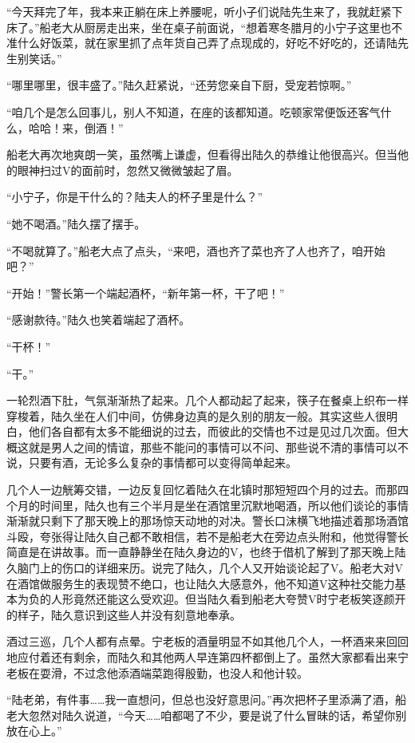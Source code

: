 “今天拜完了年，我本来正躺在床上养腰呢，听小子们说陆先生来了，我就赶紧下床了。”船老大从厨房走出来，坐在桌子前面说，“想着寒冬腊月的小宁子这里也不准什么好饭菜，就在家里抓了点年货自己弄了点现成的，好吃不好吃的，还请陆先生别笑话。”

“哪里哪里，很丰盛了。”陆久赶紧说，“还劳您亲自下厨，受宠若惊啊。”

“咱几个是怎么回事儿，别人不知道，在座的该都知道。吃顿家常便饭还客气什么，哈哈！来，倒酒！”

船老大再次地爽朗一笑，虽然嘴上谦虚，但看得出陆久的恭维让他很高兴。但当他的眼神扫过V的面前时，忽然又微微皱起了眉。

“小宁子，你是干什么的？陆夫人的杯子里是什么？”

“她不喝酒。”陆久摆了摆手。

“不喝就算了。”船老大点了点头，“来吧，酒也齐了菜也齐了人也齐了，咱开始吧？”

“开始！”警长第一个端起酒杯，“新年第一杯，干了吧！”

“感谢款待。”陆久也笑着端起了酒杯。

“干杯！”

“干。”

一轮烈酒下肚，气氛渐渐热了起来。几个人都动起了起来，筷子在餐桌上织布一样穿梭着，陆久坐在人们中间，仿佛身边真的是久别的朋友一般。其实这些人很明白，他们各自都有太多不能细说的过去，而彼此的交情也不过是见过几次面。但大概这就是男人之间的情谊，那些不能问的事情可以不问、那些说不清的事情可以不说，只要有酒，无论多么复杂的事情都可以变得简单起来。

几个人一边觥筹交错，一边反复回忆着陆久在北镇时那短短四个月的过去。而那四个月的时间里，陆久也有三个半月是坐在酒馆里沉默地喝酒，所以他们谈论的事情渐渐就只剩下了那天晚上的那场惊天动地的对决。警长口沫横飞地描述着那场酒馆斗殴，夸张得让陆久自己都不敢相信，若不是船老大在旁边点头附和，他觉得警长简直是在讲故事。而一直静静坐在陆久身边的V，也终于借机了解到了那天晚上陆久脑门上的伤口的详细来历。说完了陆久，几个人又开始谈论起了V。船老大对V在酒馆做服务生的表现赞不绝口，也让陆久大感意外，他不知道V这种社交能力基本为负的人形竟然还能这么受欢迎。但当陆久看到船老大夸赞V时宁老板笑逐颜开的样子，陆久意识到这些人并没有刻意地奉承。

酒过三巡，几个人都有点晕。宁老板的酒量明显不如其他几个人，一杯酒来来回回地应付着还有剩余，而陆久和其他两人早连第四杯都倒上了。虽然大家都看出来宁老板在耍滑，不过念他添酒端菜跑得殷勤，也没人和他计较。

“陆老弟，有件事……我一直想问，但总也没好意思问。”再次把杯子里添满了酒，船老大忽然对陆久说道，“今天……咱都喝了不少，要是说了什么冒昧的话，希望你别放在心上。”

